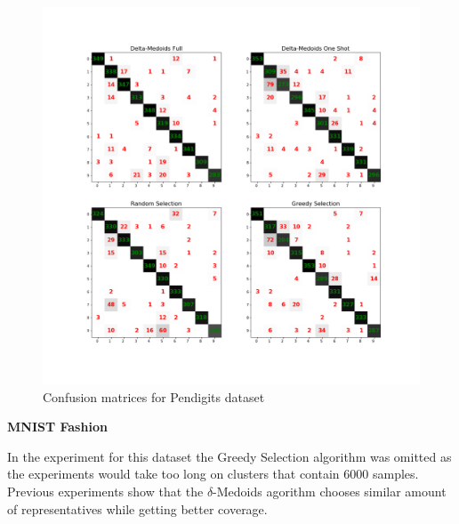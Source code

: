 \documentclass[thesis=B,english]{FITthesis}[2012/10/20]
\begin{document}
\begin{figure}[H]
   \includegraphics[width=\linewidth]{img/exp3_pendigits.png}
  \caption{Confusion matrices for Pendigits dataset}
  \label{img:exp3_pendigits}
\end{figure}

\textbf{MNIST Fashion}

In the experiment for this dataset the Greedy Selection algorithm was omitted as the experiments would take too long on clusters that contain 6000 samples.
Previous experiments show that the $\delta$-Medoids agorithm chooses similar amount of representatives while getting better coverage.
\end{document}
